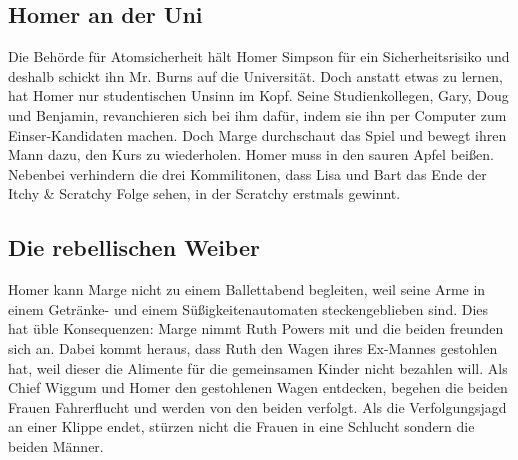	
\subsection{Homer an der Uni}\label{1F02}
Die Behörde für Atomsicherheit hält Homer Simpson für ein Sicherheitsrisiko und deshalb schickt ihn Mr. Burns auf die Universität. Doch anstatt etwas zu lernen, hat Homer nur studentischen Unsinn im Kopf. Seine Studienkollegen, Gary, Doug und Benjamin, revanchieren sich bei ihm dafür, indem sie ihn per Computer zum Einser-Kandidaten machen. Doch Marge durchschaut das Spiel und bewegt ihren Mann dazu, den Kurs zu wiederholen. Homer muss in den sauren Apfel beißen.
Nebenbei verhindern die drei Kommilitonen, dass Lisa und Bart das Ende der Itchy \& Scratchy Folge sehen, in der Scratchy erstmals gewinnt.


	
\subsection{Die rebellischen Weiber}\label{1F03}
Homer kann Marge nicht zu einem Ballettabend begleiten, weil seine Arme in einem Getränke- und einem Süßigkeitenautomaten steckengeblieben sind. Dies hat üble Konsequenzen: Marge nimmt Ruth Powers mit und die beiden freunden sich an. Dabei kommt heraus, dass Ruth den Wagen ihres Ex-Mannes gestohlen hat, weil dieser die Alimente für die gemeinsamen Kinder nicht bezahlen will. Als Chief Wiggum und Homer den gestohlenen Wagen entdecken, begehen die beiden Frauen Fahrerflucht und werden von den beiden verfolgt. Als die Verfolgungsjagd an einer Klippe endet, stürzen nicht die Frauen in eine Schlucht sondern die beiden Männer.

